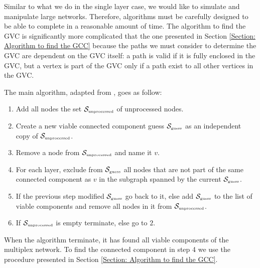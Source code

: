 \documentclass[
11pt, %
english, %
singlespacing, %
nolistspacing, %
liststotoc, %
headsepline, %
]{MastersDoctoralThesis} %
\begin{document}
Similar to what we do in the single layer case, we would like to simulate and manipulate large networks. Therefore, algorithms must be carefully designed to be able to complete in a reasonable amount of time. The algorithm to find the GVC is significantly more complicated that the one presented in Section \ref{Section: Algorithm to find the GCC} because the paths we must consider to determine the GVC are dependent on the GVC itself: a path is valid if it is fully enclosed in the GVC, but a vertex is part of the GVC only if a path exist to all other vertices in the GVC. 

The main algorithm, adapted from \cite{baxter2012avalanche}, goes as follow:

\begin{enumerate}
	\item Add all nodes the set $\mathcal{S}_{\text{\tiny unprocessed}}$ of unprocessed nodes.
	\item Create a new viable connected component guess $\mathcal{S}_{\text{\tiny guess}}$ as an independent copy of $\mathcal{S}_{\text{\tiny unprocessed}}$.
	\item Remove a node from $\mathcal{S}_{\text{\tiny unprocessed}}$ and name it $v$.
	\item For each layer, exclude from $\mathcal{S}_{\text{\tiny guess}}$ all nodes that are not part of the same connected component as $v$ in the subgraph spanned by the current $\mathcal{S}_{\text{\tiny guess}}$.
	\item If the previous step modified $\mathcal{S}_{\text{\tiny guess}}$ go back to it, else add $\mathcal{S}_{\text{\tiny guess}}$ to the list of viable components and remove all nodes in it from $\mathcal{S}_{\text{\tiny unprocessed}}$.
	\item If $\mathcal{S}_{\text{\tiny unprocessed}}$ is empty terminate, else go to $2$.
\end{enumerate}

When the algorithm terminate, it has found all viable components of the multiplex network. To find the connected component in step 4 we use the procedure presented in Section \ref{Section: Algorithm to find the GCC}.
\end{document}
